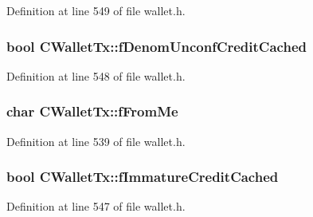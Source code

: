 Definition at line 549 of file wallet.\+h.

\hypertarget{class_c_wallet_tx_a11197a5edda9bbfa66fe94eab1329a51}{}
\subsubsection[{f\+Denom\+Unconf\+Credit\+Cached}]{\setlength{\rightskip}{0pt plus 5cm}bool C\+Wallet\+Tx\+::f\+Denom\+Unconf\+Credit\+Cached\hspace{0.3cm}{\ttfamily [mutable]}}\label{class_c_wallet_tx_a11197a5edda9bbfa66fe94eab1329a51}


Definition at line 548 of file wallet.\+h.

\hypertarget{class_c_wallet_tx_a1598bf4a18fd05ce5eaaa0c3eb58ff28}{}
\subsubsection[{f\+From\+Me}]{\setlength{\rightskip}{0pt plus 5cm}char C\+Wallet\+Tx\+::f\+From\+Me}\label{class_c_wallet_tx_a1598bf4a18fd05ce5eaaa0c3eb58ff28}


Definition at line 539 of file wallet.\+h.

\hypertarget{class_c_wallet_tx_a9f52bb55d93a7ffe20e93a4f12487815}{}
\subsubsection[{f\+Immature\+Credit\+Cached}]{\setlength{\rightskip}{0pt plus 5cm}bool C\+Wallet\+Tx\+::f\+Immature\+Credit\+Cached\hspace{0.3cm}{\ttfamily [mutable]}}\label{class_c_wallet_tx_a9f52bb55d93a7ffe20e93a4f12487815}


Definition at line 547 of file wallet.\+h.

\hypertarget{class_c_wallet_tx_a15c52b4c9a7ee5e87f86324c7e08fe96}{}
